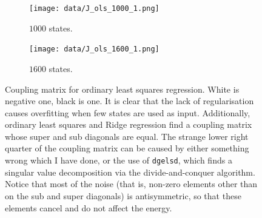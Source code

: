 \documentclass[11pt,british,a4paper]{article}
\numberwithin{equation}{section}
\begin{document}
\begin{figure}[H]
    \centering
    \begin{subfigure}[t]{0.45\textwidth}\centering
        \texttt{[image: data/J\_ols\_1000\_1.png]}
        \caption{\(\num{1000}\) states.}
    \end{subfigure}
    \begin{subfigure}[t]{0.45\textwidth}\centering
        \texttt{[image: data/J\_ols\_1600\_1.png]}
        \caption{\(\num{1600}\) states.}
    \end{subfigure}
    \caption{Coupling matrix for ordinary least squares regression. White is negative one, black is one. It is clear that the lack of regularisation causes overfitting when few states are used as input. Additionally, ordinary least squares and Ridge regression find a coupling matrix whose super and sub diagonals are equal. The strange lower right quarter of the coupling matrix can be caused by either something wrong which I have done, or the use of \lstinline{dgelsd}, which finds a singular value decomposition via the divide-and-conquer algorithm. Notice that most of the noise (that is, non-zero elements other than on the sub and super diagonals) is antisymmetric, so that these elements cancel and do not affect the energy.}
\end{figure}
\end{document}
